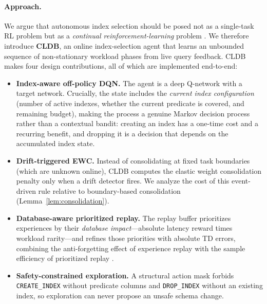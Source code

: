 \paragraph{Approach.}
We argue that autonomous index selection should be posed not as a single-task RL
problem but as a \emph{continual reinforcement-learning} problem
\citep{khetarpal2022continual}. We therefore introduce \textbf{CLDB}, an online
index-selection agent that learns an unbounded sequence of non-stationary
workload phases from live query feedback. CLDB makes four design contributions,
all of which are implemented end-to-end:
\begin{itemize}
  \item \textbf{Index-aware off-policy DQN.} The agent is a deep Q-network
    \citep{mnih2015dqn} with a target network. Crucially, the state includes the
    \emph{current index configuration} (number of active indexes, whether the
    current predicate is covered, and remaining budget), making the process a
    genuine Markov decision process rather than a contextual bandit: creating an
    index has a one-time cost and a recurring benefit, and dropping it is a
    decision that depends on the accumulated index state.
  \item \textbf{Drift-triggered EWC.} Instead of consolidating at fixed task
    boundaries (which are unknown online), CLDB computes the elastic weight
    consolidation penalty \citep{kirkpatrick2017ewc} only when a drift detector
    \citep{gama2014drift} fires. We analyze the cost of this event-driven rule
    relative to boundary-based consolidation (Lemma~\ref{lem:consolidation}).
  \item \textbf{Database-aware prioritized replay.} The replay buffer
    prioritizes experiences by their \emph{database impact}---absolute latency
    reward times workload rarity---and refines those priorities with absolute TD
    errors, combining the anti-forgetting effect of experience replay
    \citep{rolnick2019replay} with the sample efficiency of prioritized replay
    \citep{schaul2016prioritized}.
  \item \textbf{Safety-constrained exploration.} A structural action mask forbids
    \texttt{CREATE\_INDEX} without predicate columns and \texttt{DROP\_INDEX}
    without an existing index, so exploration can never propose an unsafe schema
    change.
\end{itemize}

